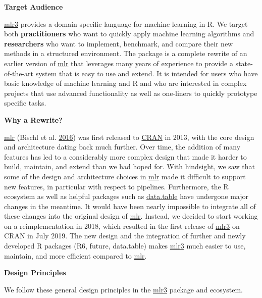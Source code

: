 \documentclass[]{scrbook}
\begin{document}
\textbf{Target Audience}

\href{https://mlr3.mlr-org.com}{mlr3} provides a domain-specific language for machine learning in R.
We target both \textbf{practitioners} who want to quickly apply machine learning algorithms and \textbf{researchers} who want to implement, benchmark, and compare their new methods in a structured environment.
The package is a complete rewrite of an earlier version of \href{https://mlr.mlr-org.com}{mlr} that leverages many years of experience to provide a state-of-the-art system that is easy to use and extend.
It is intended for users who have basic knowledge of machine learning and R and who are interested in complex projects that use advanced functionality as well as one-liners to quickly prototype specific tasks.

\textbf{Why a Rewrite?}

\href{https://mlr.mlr-org.com}{mlr} (Bischl et al. \protect\hyperlink{ref-mlr}{2016}) was first released to \href{https://cran.r-project.org}{CRAN} in 2013, with the core design and architecture dating back much further.
Over time, the addition of many features has led to a considerably more complex design that made it harder to build, maintain, and extend than we had hoped for.
With hindsight, we saw that some of the design and architecture choices in \href{https://mlr.mlr-org.com}{mlr} made it difficult to support new features, in particular with respect to pipelines.
Furthermore, the R ecosystem as well as helpful packages such as \href{https://cran.r-project.org/package=data.table}{data.table} have undergone major changes in the meantime.
It would have been nearly impossible to integrate all of these changes into the original design of \href{https://mlr.mlr-org.com}{mlr}.
Instead, we decided to start working on a reimplementation in 2018, which resulted in the first release of \href{https://mlr3.mlr-org.com}{mlr3} on CRAN in July 2019.
The new design and the integration of further and newly developed R packages (R6, future, data.table) makes \href{https://mlr3.mlr-org.com}{mlr3} much easier to use, maintain, and more efficient compared to \href{https://mlr.mlr-org.com}{mlr}.

\textbf{Design Principles}

We follow these general design principles in the \href{https://mlr3.mlr-org.com}{mlr3} package and ecosystem.
\end{document}
